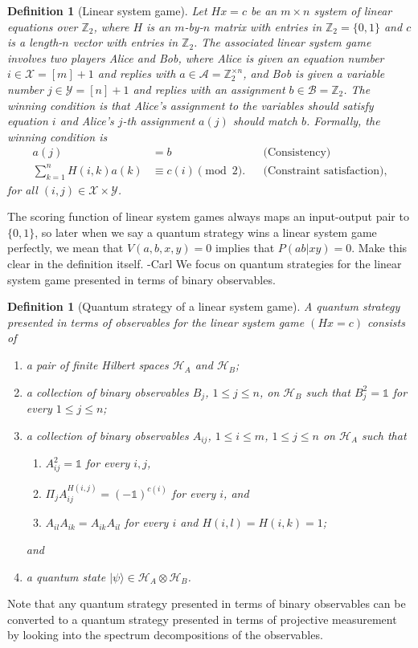 \documentclass[11pt,letterpaper]{article}
\newcommand{\ket}[1]{|#1\rangle}
\newcommand{\x}{\otimes}
\newcommand{\Z}{\mathbb{Z}}
\newcommand{\calH}{\mathcal{H}}
\newcommand{\calX}{\mathcal{X}}
\newcommand{\calY}{\mathcal{Y}}
\newcommand{\calA}{\mathcal{A}}
\newcommand{\calB}{\mathcal{B}}
\newcommand{\1}{\mathbb{1}}
\newcommand{\pr}[2]{P(#1|#2)}
\def\carl#1{{\color{blue} #1 -Carl}}
\newtheorem{definition}[theorem]{Definition}
\theoremstyle{definition}
\begin{document}
\begin{definition}[Linear system game]
 Let $Hx = c$ be an $m \times n$ system of linear equations over $\Z_2$,
 where $H$ is an $m$-by-$n$ matrix with entries in $\Z_2 = \{0,1\}$ and 
 $c$ is a length-$n$ vector with entries in $\Z_2$. 
 The associated linear system game involves two
 players Alice and Bob, where Alice is given an equation number $i \in \calX = [m]+1$ and replies with $a \in \calA = \Z_2^{\times n}$,
 and Bob is given a variable number $j \in \calY = [n]+1$ and replies with an assignment $b \in \calB = \Z_2$. The winning condition is 
 that Alice's assignment to the variables should satisfy equation $i$ and Alice's $j$-th assignment $a(j)$ should match $b$.
 Formally, the winning condition is 
 \begin{align*}
 	a(j) &= b && \text{(Consistency)} \\
	\sum_{k= 1}^n H(i,k) a(k) &\equiv c(i) \pmod 2. &&\text{(Constraint satisfaction)},
 \end{align*}
 for all $(i,j) \in \calX \times \calY$. 
\end{definition}
The scoring function of linear system games always maps an input-output pair to $\{0,1\}$, 
so later when we say a quantum strategy wins a linear system game perfectly, we mean that 
$V(a,b,x,y) =0$ implies that $\pr{ab}{xy} = 0$.  \carl{Make this clear in the definition itself.}
We focus on quantum strategies for the linear system game presented in terms of binary observables.
\begin{definition}[Quantum strategy of a linear system game]
\label{def:q_strat}
A quantum strategy presented in terms of observables for the linear system game $(Hx = c)$ consists of 
\begin{enumerate}
	\item a pair of finite Hilbert spaces $\calH_A$ and $\calH_B$;
	\item a collection of binary observables $B_j$, $1 \leq j \leq n$, on $\calH_B$
	such that $B_j^2 = \1$ for every $1 \leq j \leq n$;
	\item a collection of binary observables $A_{ij}$, $1\leq i \leq m$, $1\leq j\leq n$ 
	on $\calH_A$ such that 
	\begin{enumerate}
		\item $A_{ij}^2 = \1$ for every $i,j$,
		\item $\Pi_j A_{ij}^{H(i,j)} = (-\1)^{c(i)}$ for every $i$, and
		\item $A_{il}A_{ik} = A_{ik}A_{il}$ for every $i$ and $H(i,l) = H(i,k) =1$;
	\end{enumerate} 
	and
	\item a quantum state $\ket{\psi} \in \calH_A \x \calH_B$.
\end{enumerate}
\end{definition}
Note that any quantum strategy presented in terms of binary observables can be 
converted to a quantum strategy presented in terms of projective measurement by looking into
the spectrum decompositions of the observables.
\end{document}
